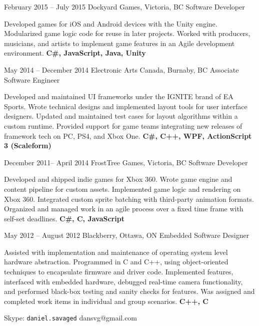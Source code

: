 \documentclass[10pt]{tccv}
\begin{document}
\begin{eventlist}

\item{February 2015 -- July 2015}
     {Dockyard Games, Victoria, BC}
     {Software Developer}
     
Developed games for iOS and Android devices with the Unity engine. Modularized game logic code for reuse in later projects. Worked with producers, musicians, and artists to implement game features in an Agile development environment. \textbf{C\#, JavaScript, Java, Unity}

\item{May 2014 -- December 2014}
     {Electronic Arts Canada, Burnaby, BC}
     {Associate Software Engineer}

Developed and maintained UI frameworks under the IGNITE brand of EA Sports. Wrote technical designs and implemented layout tools for user interface designers. Updated and maintained test cases for layout algorithms within a custom runtime. Provided support for game teams integrating new releases of framework tech on PC, PS4, and Xbox One. \textbf{C\#, C++, WPF, ActionScript 3 (Scaleform)}

\item{December 2011-- April 2014}
     {FrostTree Games, Victoria, BC}
     {Software Developer}

Developed and shipped indie games for Xbox 360. Wrote game engine and content pipeline for custom assets. Implemented game logic and rendering on Xbox 360. Integrated custom sprite batching with third-party animation formats. Organized and managed work in an agile process over a fixed time frame with self-set deadlines. \textbf{C\#, C, JavaScript}

\item{May 2012 -- August 2012}
     {Blackberry, Ottawa, ON}
     {Embedded Software Designer}

Assisted with implementation and maintenance of operating system level hardware abstraction. Programmed in C and C++, using object-oriented techniques to encapsulate firmware and driver code. Implemented features, interfaced with embedded hardware, debugged real-time camera functionality, and performed black-box testing and sanity checks for features. Was assigned and completed work items in individual and group scenarios. \textbf{C++, C}

\end{eventlist}

    {Skype: \texttt{daniel.savaged}}
    {dansvg@gmail.com}
\end{document}
